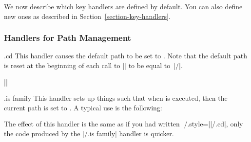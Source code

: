 We now describe which key handlers are defined by default. You can
also define new ones as described in Section~\ref{section-key-handlers}.


\subsubsection{Handlers for Path Management}

\begin{handler}{{.cd}}
  This handler causes the default path to be set to . Note that
  the default path is reset at the beginning of each call to
  |\pgfkeys| to be equal to~|/|.

  \example ||
\end{handler}

\begin{handler}{{.is family}}
\label{section-is family-handler}
  This handler sets up things such that when  is executed, then
  the current path is set to . A typical use is the following:
\begin{codeexample}
\end{codeexample}
  The effect of this handler is the same as if you had written
  |/.style=||/.cd|, only the code produced by the
  |/.is family| handler is quicker.
\end{handler}

